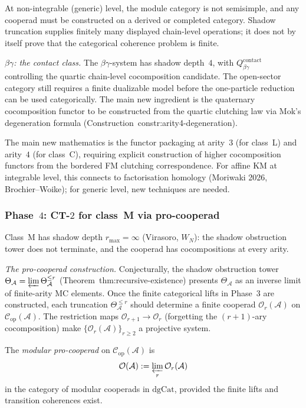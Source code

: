 \documentclass[11pt]{article}
\newcommand{\cA}{\mathcal{A}}
\newcommand{\cC}{\mathcal{C}}
\newcommand{\cO}{\mathcal{O}}
\begin{document}
At non-integrable (generic) level, the module category is
not semisimple, and any cooperad must be constructed on a derived
or completed category.  Shadow truncation supplies finitely many
displayed chain-level operations; it does not by itself prove that
the categorical coherence problem is finite.

\noindent\emph{$\beta\gamma$: the contact class.}
The $\beta\gamma$-system has shadow depth~$4$, with
$Q^{\mathrm{contact}}_{\beta\gamma}$ controlling the quartic
chain-level cocomposition candidate.  The open-sector category
still requires a finite dualizable model before the one-particle
reduction can be used categorically.  The main new ingredient is
the quaternary cocomposition functor to be constructed from the
quartic clutching law via Mok's degeneration formula
(Construction~\textup{constr:arity4-degeneration}).

The main new mathematics is the functor packaging at arity~$3$
(for class~L) and arity~$4$ (for class~C), requiring explicit
construction of higher cocomposition functors from the bordered
FM clutching correspondence.  For affine KM at integrable level,
this connects to factorisation homology (Moriwaki 2026,
Brochier--Woike); for generic level, new techniques are needed.

\subsubsection*{Phase~$4$: CT-$2$ for class~M via pro-cooperad}
\label{par:ct2-phase4}

Class~M has shadow depth $r_{\max} = \infty$ (Virasoro, $W_N$):
the shadow obstruction tower does not terminate, and the cooperad has
cocompositions at every arity.

\noindent\emph{The pro-cooperad construction.}
Conjecturally, the shadow obstruction tower
$\Theta_\cA = \varprojlim \Theta_\cA^{\leq r}$
(Theorem~\textup{thm:recursive-existence}) presents $\Theta_\cA$
as an inverse limit of finite-arity MC elements.  Once the
finite categorical lifts in Phase~$3$ are constructed, each
truncation $\Theta_\cA^{\leq r}$ should determine a finite
cooperad $\cO_r(\cA)$ on $\cC_{\mathrm{op}}(\cA)$.  The
restriction maps $\cO_{r+1} \to \cO_r$ (forgetting the
$(r{+}1)$-ary cocomposition) make
$\{\cO_r(\cA)\}_{r \geq 2}$ a projective system.

\begin{definition*}
The \emph{modular pro-cooperad} on $\cC_{\mathrm{op}}(\cA)$ is
\[
  \cO(\cA) := \varprojlim_{r} \cO_r(\cA)
\]
in the category of modular cooperads in $\mathrm{dgCat}$,
provided the finite lifts and transition coherences exist.
\end{definition*}
\end{document}
